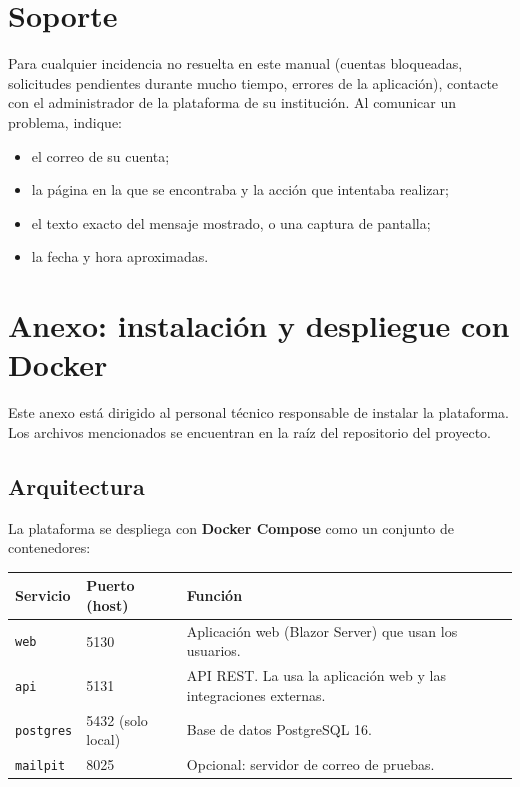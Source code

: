 \documentclass[11pt,a4paper]{article}
\newcommand{\seccion}[1]{\clearpage\section{#1}}
\begin{document}
\seccion{Soporte}

Para cualquier incidencia no resuelta en este manual (cuentas bloqueadas,
solicitudes pendientes durante mucho tiempo, errores de la aplicación), contacte
con el administrador de la plataforma de su institución. Al comunicar un problema,
indique:

\begin{itemize}
  \item el correo de su cuenta;
  \item la página en la que se encontraba y la acción que intentaba realizar;
  \item el texto exacto del mensaje mostrado, o una captura de pantalla;
  \item la fecha y hora aproximadas.
\end{itemize}

\clearpage
\appendix
\renewcommand{\thesection}{\Alph{section}}
\section{Anexo: instalación y despliegue con Docker}
\label{anexo:despliegue}

Este anexo está dirigido al personal técnico responsable de instalar la
plataforma. Los archivos mencionados se encuentran en la raíz del repositorio del
proyecto.

\subsection{Arquitectura}

La plataforma se despliega con \textbf{Docker Compose} como un conjunto de
contenedores:

\begin{center}
\begin{tabularx}{\textwidth}{@{}l l Y@{}}
\toprule
{}
\textbf{Servicio} & \textbf{Puerto (host)} & \textbf{Función} \\
\midrule
\texttt{web} & 5130 & Aplicación web (Blazor Server) que usan los usuarios. \\
\texttt{api} & 5131 & API REST. La usa la aplicación web y las integraciones externas. \\
\texttt{postgres} & 5432 (solo local) & Base de datos PostgreSQL 16. \\
\texttt{mailpit} & 8025 & Opcional: servidor de correo de pruebas. \\
\bottomrule
\end{tabularx}
\end{center}
\end{document}
